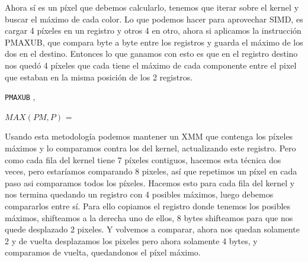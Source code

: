 Ahora sí es un píxel que debemos calcularlo, tenemos que iterar sobre el kernel y buscar el máximo de cada color. Lo que podemos hacer para aprovechar SIMD, es cargar 4 píxeles en un registro y otros 4 en otro, ahora si aplicamos la instrucción PMAXUB, que compara byte a byte entre los registros y guarda el máximo de los dos en el destino. Entonces lo que ganamos con esto es que en el registro destino nos quedó 4 píxeles que cada tiene el máximo de cada componente entre el pixel que estaban en la misma posición de los 2 registros. 

\begin{center}
 

 

\texttt{PMAXUB} ,  \hfill

 
\end{center}

$MAX(PM,P)$ = 

Usando esta metodología podemos mantener un XMM que contenga los píxeles máximos y lo comparamos contra los del kernel, actualizando este registro. Pero como cada fila del kernel tiene 7 píxeles contiguos, hacemos esta técnica dos veces, pero estaríamos comparando 8 pixeles, así que repetimos un píxel en cada paso asi comparamos todos los píxeles. Hacemos esto para cada fila del kernel y nos termina quedando un registro con 4 posibles máximos, luego debemos compararlos entre sí. Para ello copiamos el registro donde tenemos los posibles máximos, shifteamos a la derecha uno de ellos, 8 bytes shifteamos para que nos quede desplazado 2 pixeles. Y volvemos a comparar, ahora nos quedan solamente 2 y de vuelta desplazamos los pixeles pero ahora solamente 4 bytes, y comparamos de vuelta, quedandonos el píxel máximo.

